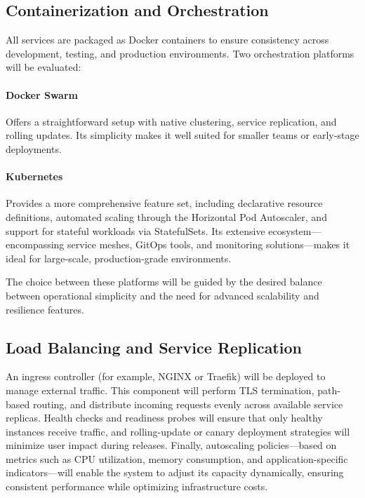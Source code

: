\subsection{Containerization and Orchestration}

All services are packaged as Docker containers to ensure consistency across development, testing, and production environments. Two orchestration platforms will be evaluated:

\paragraph{Docker Swarm}  
Offers a straightforward setup with native clustering, service replication, and rolling updates. Its simplicity makes it well suited for smaller teams or early‐stage deployments.

\paragraph{Kubernetes}  
Provides a more comprehensive feature set, including declarative resource definitions, automated scaling through the Horizontal Pod Autoscaler, and support for stateful workloads via StatefulSets. Its extensive ecosystem—encompassing service meshes, GitOps tools, and monitoring solutions—makes it ideal for large‐scale, production‐grade environments.

The choice between these platforms will be guided by the desired balance between operational simplicity and the need for advanced scalability and resilience features.

\subsection{Load Balancing and Service Replication}

An ingress controller (for example, NGINX\cite{NGINX} or Traefik\cite{TRAEFIK}) will be deployed to manage external traffic. This component will perform TLS termination, path-based routing, and distribute incoming requests evenly across available service replicas. Health checks and readiness probes will ensure that only healthy instances receive traffic, and rolling-update or canary deployment strategies will minimize user impact during releases. Finally, autoscaling policies—based on metrics such as CPU utilization, memory consumption, and application-specific indicators—will enable the system to adjust its capacity dynamically, ensuring consistent performance while optimizing infrastructure costs.  
